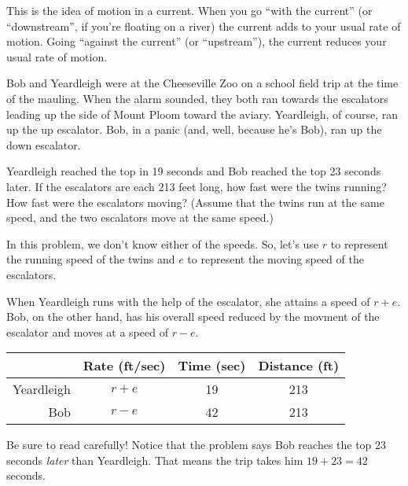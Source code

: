 This is the idea of motion in a current. When you go ``with the current'' (or ``downstream'', if you're floating on a river) the current adds to your usual rate of motion. Going ``against the current'' (or ``upstream''), the current reduces your usual rate of motion.


\begin{boxex}
Bob and Yeardleigh were at the Cheeseville Zoo on a school field trip at the time of the mauling. When the alarm sounded, they both ran towards the escalators leading up the side of Mount Ploom toward the aviary. Yeardleigh, of course, ran up the up escalator. Bob, in a panic (and, well, because he's Bob), ran up the down escalator.

Yeardleigh reached the top in 19 seconds and Bob reached the top 23 seconds later. If the escalators are each 213 feet long, how fast were the twins running? How fast were the escalators moving? (Assume that the twins run at the same speed, and the two escalators move at the same speed.)
\end{boxex}

In this problem, we don't know either of the speeds. So, let's use $r$ to represent the running speed of the twins and $e$ to represent the moving speed of the escalators.

When Yeardleigh runs with the help of the escalator, she attains a speed of $r+e$. Bob, on the other hand, has his overall speed reduced by the movment of the escalator and moves at a speed of $r-e$.

\begin{center}
\begin{tabular}{r|ccc}
	& Rate (ft/sec)			& Time (sec)		& Distance (ft)\\\hline
Yeardleigh	& $r+e$		& 19			& 213\\
Bob			& $r-e$			& 42			& 213\\
\end{tabular}
\end{center}
Be sure to read carefully! Notice that the problem says Bob reaches the top 23 seconds \emph{later} than Yeardleigh. That means the trip takes him $19+23=42$ seconds. 

